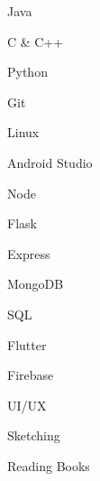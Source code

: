 \documentclass[]{deedy-resume-openfont}
\begin{document}
\begin{minipage}[t]{0.33\textwidth}
\hfill
\vspace{\topsep} %
\begin{tightemize}
\item Java
\item C \& C++
\item Python 
\end{tightemize}
\sectionsep

\vspace{\topsep} %
\begin{tightemize}
\item Git
\item Linux
\item Android Studio
\end{tightemize}
\sectionsep

\vspace{\topsep} %
\begin{tightemize}
\item Node
\item Flask
\item Express
\end{tightemize}
\sectionsep


\vspace{\topsep} %
\begin{tightemize}
\item MongoDB
\item SQL
\item Flutter
\item Firebase
\end{tightemize}
\sectionsep


\vspace{\topsep} %
\begin{tightemize}
\item UI/UX
\item Sketching
\item Reading Books
\end{tightemize}
\sectionsep


%
%

\end{minipage} 
\end{document}
